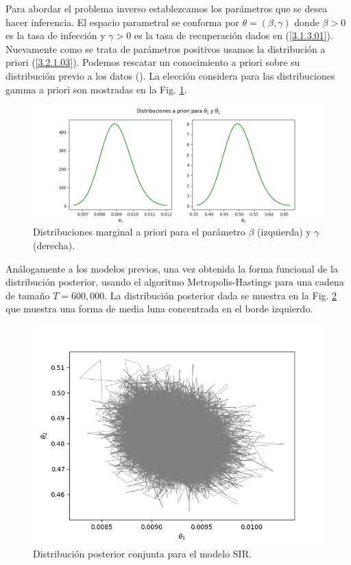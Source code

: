 Para abordar el problema inverso establezcamos los parámetros que se desea hacer inferencia. El espacio parametral se conforma por $\theta = (\beta,\gamma)$ donde $\beta >0$ es la tasa de infección y $\gamma > 0$ es la tasa de recuperación dados en (\ref{3.1.3.01}). Nuevamente como se trata de parámetros positivos usamos la distribución a priori (\ref{3.2.1.03}). Podemos rescatar un conocimiento a priori sobre su distribución previo a los datos (\cite{weiss2013sir}). La elección considera para las distribuciones gamma a priori son mostradas en la Fig. \ref{Fig. SIR_02}.

\begin{figure}[H] 
    \centering 
    \includegraphics[width = 15 cm ]{img/Exp_Central_SIR_sigma/Figuras/Generales/Apriori_SIR_sigma.png} 
    \caption{Distribuciones marginal a priori para el parámetro $\beta$ (izquierda) y $\gamma$ (derecha).}
    \label{Fig. SIR_02}
\end{figure} 

Análogamente a los modelos previos, una vez obtenida la forma funcional de la distribución posterior, usando el algoritmo Metropolis-Hastings para una cadena de tamaño $T = 600,000$. La distribución posterior dada se muestra en la Fig. \ref{Fig. SIR_03} que muestra una forma de media luna concentrada en el borde izquierdo. 

\begin{figure}[H] 
    \centering 
    \includegraphics[width = 10 cm]{img/Exp_Central_SIR_sigma/Figuras/Generales/Conjunta_SIR_sigma.png} 
    \caption{Distribución posterior conjunta para el modelo SIR.}
    \label{Fig. SIR_03}
\end{figure} 


